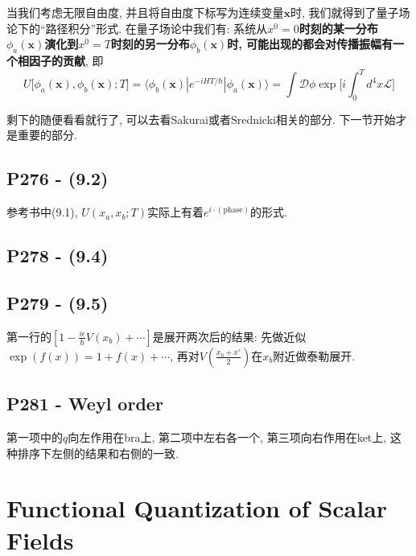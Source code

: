 当我们考虑无限自由度, 并且将自由度下标写为连续变量$\mathbf{x}$时, 我们就得到了量子场论下的“路径积分”形式. 在量子场论中我们有: 系统从\textbf{$x^0=0$时刻的某一分布$\phi_a(\mathbf{x})$演化到$x^0=T$时刻的另一分布$\phi_b(\mathbf{x})$时, 可能出现的都会对传播振幅有一个相因子的贡献}, 即
\begin{equation*}
  U\bigl[\phi_a(\mathbf{x}),\phi_b(\mathbf{x});T\bigr]=\langle \phi_b(\mathbf{x})|e^{-iHT/\hbar}|\phi_a(\mathbf{x}) \rangle = \int \mathcal{D}\phi \exp\biggl[i\int_{0}^{T} d^4x\mathcal{L}\biggr]
\end{equation*}

剩下的随便看看就行了, 可以去看Sakurai或者Srednicki相关的部分.
下一节开始才是重要的部分.

\subsection{P276 - (9.2)}

参考书中(9.1), $U(x_a, x_b; T)$实际上有着$e^{i \cdot (\text{phase})}$的形式.

\subsection{P278 - (9.4)}


\subsection{P279 - (9.5)}

第一行的$[1-\frac{i\epsilon}{\hbar}V(x_b)+\cdots]$是展开两次后的结果: 先做近似$\exp(f(x)) = 1 + f(x) + \cdots$, 再对$V(\frac{x_b + x'}{2})$在$x_b$附近做泰勒展开.

\subsection{P281 - Weyl order}

第一项中的$q$向左作用在bra上, 第二项中左右各一个, 第三项向右作用在ket上, 这种排序下左侧的结果和右侧的一致.

\section{Functional Quantization of Scalar Fields}

